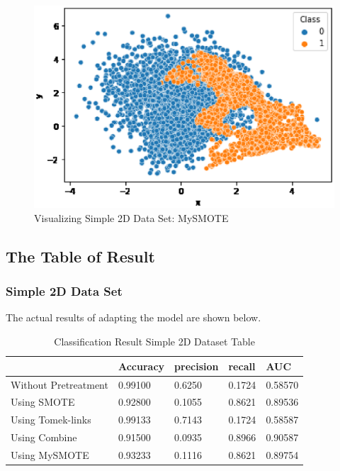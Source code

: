 \begin{center}
    \begin{figure}[ht]
        \caption{Visualizing Simple 2D Data Set: MySMOTE}
        \label{tab:team-rating-features}
        \begin{center}
            \includegraphics[scale=0.6]{image/mysmote.eps}
        \end{center}
    \end{figure}
\end{center}

\clearpage

\subsection{The Table of Result}
\subsubsection{Simple 2D Data Set}
The actual results of adapting the model are shown below.
\begin{table}[H]
    \caption{Classification Result Simple 2D Dataset Table}
    \centering
    \begin{tabular}{|l|l|l|l|l|}
    \hline
         & Accuracy & precision & recall & AUC \\ \hline
        Without Pretreatment & 0.99100 & 0.6250 & 0.1724 & 0.58570 \\ \hline
        Using SMOTE & 0.92800 & 0.1055 & 0.8621 & 0.89536 \\ \hline
        Using Tomek-links & 0.99133 & 0.7143 & 0.1724 & 0.58587 \\ \hline
        Using Combine & 0.91500 & 0.0935 & 0.8966 & 0.90587 \\ \hline
        Using MySMOTE & 0.93233 & 0.1116 & 0.8621 & 0.89754 \\ \hline
    \end{tabular}
\end{table}


